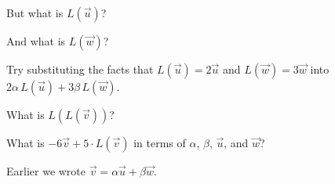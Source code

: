 \documentclass{ximera}
\begin{document}
\begin{question}
\begin{solution}
    \begin{hint}
      \begin{question}
        \begin{solution}
          But what is $L(\vec{u})$?

          \begin{multiple-choice}
          \end{multiple-choice} 
        \end{solution}
      \end{question}
    \end{hint}

    \begin{hint}
      \begin{question}
        \begin{solution}
          And what is $L(\vec{w})$?

          \begin{multiple-choice}
          \end{multiple-choice} 
        \end{solution}
      \end{question}
    \end{hint}

    \begin{hint}
      Try substituting the facts that $L(\vec{u}) = 2 \vec{u}$ and $L(\vec{w}) = 3 \vec{w}$ into $2\alpha\,L(\vec{u}) + 3\beta\,L(\vec{w})$.
    \end{hint}

    What is $L(L(\vec{v}))$?
    \begin{multiple-choice}
    \end{multiple-choice} 
  \end{solution}

  What is $-6 \vec{v} + 5 \cdot L(\vec{v})$ in terms of $\alpha$, $\beta$, $\vec{u}$, and $\vec{w}$?
  \begin{solution}
    \begin{hint}
      Earlier we wrote $\vec{v} = \alpha \vec{u} + \beta \vec{w}$.
    \end{hint}


\end{solution}
\end{question}
\end{document}
